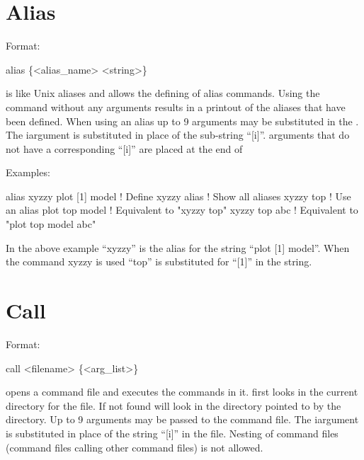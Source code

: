 \vfil
\break

\section{Alias}
\label{s:alias}

Format: 
\begin{example}
  alias \{<alias_name> <string>\}
\end{example}

\vskip 0.2in

 is like Unix aliases and allows the defining of alias
commands. Using the  command without any arguments results
in a printout of the aliases that have been defined. When using an
alias up to 9 arguments may be substituted in the . The
i\Th argument is substituted in place of the sub-string ``[i]''.
arguments that do not have a corresponding ``[i]'' are placed at the end
of 

Examples:
\begin{example}
    alias xyzzy plot [1] model  ! Define xyzzy
    alias                       ! Show all aliases
    xyzzy top                   ! Use an alias
    plot top model              ! Equivalent to "xyzzy top"
    xyzzy top abc               ! Equivalent to "plot top model abc"
\end{example}
In the above example ``xyzzy'' is the alias for the string ``plot [1]
model''.  When the command xyzzy is used ``top'' is substituted
for ``[1]'' in the string.

\section{Call}
\label{s:call}

Format: 
\begin{example}
  call <filename> \{<arg_list>\}  \Strut
\end{example}

\vskip 0.2in  opens a command file and executes the commands
in it.  \tao first looks in the current directory for the file. If not
found \tao will look in the directory pointed to by the
 directory.  Up to 9 arguments may be passed to
the command file. The i\Th argument is substituted in place of the
string ``[i]'' in the file. Nesting of command files (command files
calling other command files) is not allowed.

